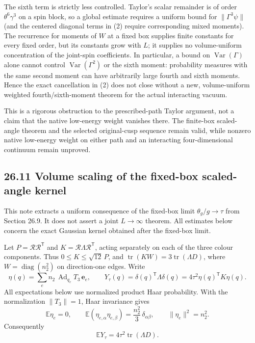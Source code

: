 \documentclass[
  11pt,
]{article}
\begin{document}
The sixth term is strictly less controlled. Taylor's scalar remainder is
of order \(\theta^6\gamma^3\) on a spin block, so a global estimate
requires a uniform bound for \(\|\Gamma^3\psi\|\) (and the centered
diagonal terms in (2) require corresponding mixed moments). The
recurrence for moments of \(W\) at a fixed box supplies finite constants
for every fixed order, but its constants grow with \(L\); it supplies no
volume-uniform concentration of the joint-spin coefficients. In
particular, a bound on \(\operatorname{Var}(\Gamma)\) alone cannot
control \(\operatorname{Var}(\Gamma^2)\) or the sixth moment:
probability measures with the same second moment can have arbitrarily
large fourth and sixth moments. Hence the exact cancellation in (2) does
not close without a new, volume-uniform weighted fourth/sixth-moment
theorem for the actual interacting vacuum.

This is a rigorous obstruction to the prescribed-path Taylor argument,
not a claim that the native low-energy weight vanishes there. The
finite-box scaled-angle theorem and the selected original-cusp sequence
remain valid, while nonzero native low-energy weight on either path and
an interacting four-dimensional continuum remain unproved.

\subsection{26.11 Volume scaling of the fixed-box scaled-angle
kernel}\label{volume-scaling-of-the-fixed-box-scaled-angle-kernel}

This note extracts a uniform consequence of the fixed-box limit
\(\theta_g/g\to\tau\) from Section 26.9. It does not assert a joint
\(L\to\infty\) theorem. All estimates below concern the exact Gaussian
kernel obtained after the fixed-box limit.

Let \(P=\mathscr R\mathscr R^{\mathsf T}\) and
\(K=\mathscr R\Lambda\mathscr R^{\mathsf T}\), acting separately on each
of the three colour components. Thus \(0\le K\le\sqrt{12}\,P\), and
\(\operatorname{tr}(KW)=3\operatorname{tr}(\Lambda D)\), where
\(W=\operatorname{diag}(n_2^2)\) on direction-one edges. Write \[
 \eta(q)=\sum_e n_2\,\operatorname{Ad}_{q_e}T_3\,\mathbf e_e,
 \qquad Y_\tau(q)=\delta(q)^{\mathsf T}\Lambda\delta(q)
        =4\tau^2\eta(q)^{\mathsf T}K\eta(q).
\] All expectations below use normalized product Haar probability. With
the normalization \(\|T_3\|=1\), Haar invariance gives \[
 \mathbb E\eta_e=0,
 \qquad \mathbb E(\eta_{e,\alpha}\eta_{e,\beta})
     =\frac{n_2^2}{3}\,\delta_{\alpha\beta},
 \qquad \|\eta_e\|^2=n_2^2.
\] Consequently \[
 \mathbb E Y_\tau=4\tau^2\operatorname{tr}(\Lambda D). \tag{V1}
\]
\end{document}
